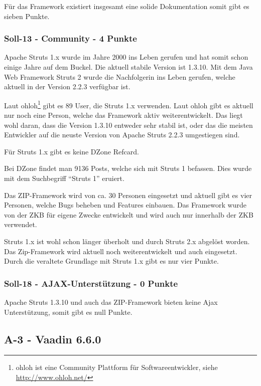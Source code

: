   Für das Framework existiert insgesamt eine solide Dokumentation somit gibt es
  sieben Punkte.
  
  \subsubsection{Soll-13 - Community - 4 Punkte}
  
  Apache Struts 1.x wurde im Jahre 2000 ins Leben gerufen und hat somit schon
  einige Jahre auf dem Buckel. Die aktuell stabile Version ist 1.3.10. Mit dem
  Java Web Framework Struts 2 wurde die Nachfolgerin ins Leben gerufen, welche
  aktuell in der Version 2.2.3 verfügbar ist.
  
  Laut ohloh\footnote{ohloh ist eine Community Plattform für
  Softwareentwickler, siehe \url{http://www.ohloh.net/}} gibt es 89 User, die
  Struts 1.x verwenden. Laut ohloh gibt es aktuell nur noch eine Person, welche
  das Framework aktiv weiterentwickelt. Das liegt wohl daran, dass die Version
  1.3.10 entweder sehr stabil ist, oder das die meisten Entwickler auf die 
  neuste Version von Apache Struts 2.2.3 umgestiegen sind.
  
  Für Struts 1.x gibt es keine DZone Refcard.
  
  Bei DZone findet man 9136 Posts, welche sich mit Struts 1 befassen. Dies wurde
  mit dem Suchbegriff ``Struts 1'' eruiert.
  
  Das ZIP-Framework wird von ca. 30 Personen eingesetzt und aktuell gibt es vier
  Personen, welche Bugs beheben und Features einbauen. Das Framework wurde von
  der \ac{ZKB} für eigene Zwecke entwickelt und wird auch nur innerhalb der
  \ac{ZKB} verwendet.
  
  Struts 1.x ist wohl schon länger überholt und durch Struts 2.x abgelöst
  worden. Das Zip-Framework wird aktuell noch weiterentwickelt und auch
  eingesetzt. Durch die veraltete Grundlage mit Struts 1.x gibt es nur vier
  Punkte.

  \subsubsection{Soll-18 - AJAX-Unterstützung - 0 Punkte}
  
  Apache Struts 1.3.10 und auch das ZIP-Framework bieten keine \ac{Ajax}
  Unterstützung, somit gibt es null Punkte.
  
  \subsection{A-3 - Vaadin 6.6.0}
  
